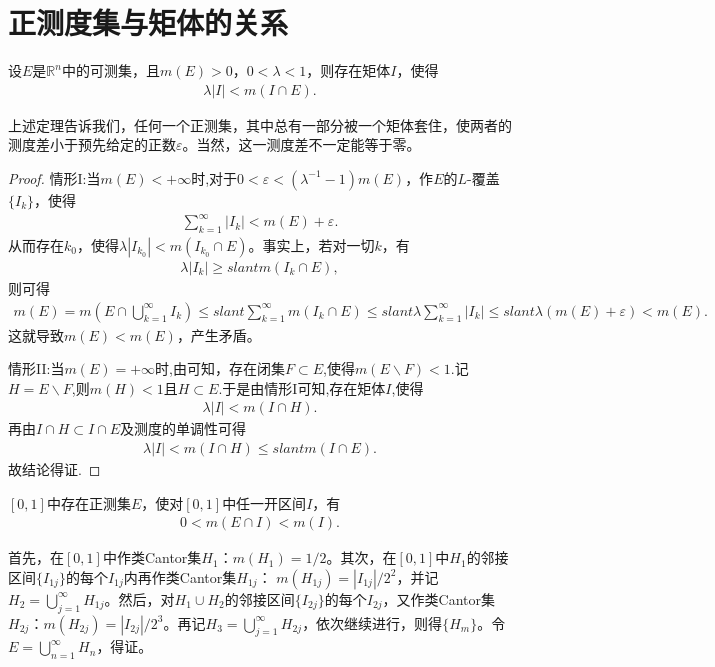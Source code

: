 \documentclass[../../main.tex]{subfiles}
\begin{document}
\section{正测度集与矩体的关系}

\begin{theorem}\label{theorem:定理2.19}
设\(E\)是\(\mathbb{R}^n\)中的可测集，且\(m(E)>0\)，\(0 < \lambda < 1\)，则存在矩体\(I\)，使得
\begin{align}
\lambda|I|<m(I\cap E).\label{eq:2.8}
\end{align}
\end{theorem}
\begin{remark}
上述定理告诉我们，任何一个正测集，其中总有一部分被一个矩体套住，使两者的测度差小于预先给定的正数\(\varepsilon\)。当然，这一测度差不一定能等于零。 
\end{remark}
\begin{proof}
{\heiti 情形I:}当\(m(E)<+\infty\)时,对于\(0 < \varepsilon < (\lambda^{-1}-1)m(E)\)，作\(E\)的\(L\)-覆盖\(\{I_k\}\)，使得
\begin{align*}
\sum_{k = 1}^{\infty}|I_k|<m(E)+\varepsilon.
\end{align*}
从而存在\(k_0\)，使得\(\lambda|I_{k_0}|<m(I_{k_0}\cap E)\)。事实上，若对一切\(k\)，有
\begin{align*}
\lambda|I_k|\geqslant slant m(I_k\cap E),
\end{align*}
则可得
\begin{align*}
m(E)=m(E\cap \bigcup_{k=1}^{\infty}I_k)\leqslant slant\sum_{k = 1}^{\infty}m(I_k\cap E)\leqslant slant\lambda\sum_{k = 1}^{\infty}|I_k|\leqslant slant\lambda(m(E)+\varepsilon)<m(E).
\end{align*}
这就导致\(m(E)<m(E)\)，产生矛盾。

{\heiti 情形II:}当$m(E)=+\infty$时,由可知，存在闭集$F\subset E$,使得$m(E\backslash F)<1$.记$H=E\backslash F$,则$m(H)<1$且$H\subset E$.于是由{\heiti 情形I}可知,存在矩体$I$,使得
\begin{align*}
\lambda |I|<m(I\cap H).
\end{align*}
再由$I\cap H\subset I\cap E$及测度的单调性可得
\begin{align*}
\lambda |I|<m(I\cap H)\leqslant slant m(I\cap E).
\end{align*}
故结论得证.
\end{proof}

\begin{example}
\([0,1]\)中存在正测集\(E\)，使对\([0,1]\)中任一开区间\(I\)，有
\begin{align*}
0 < m(E\cap I) < m(I).
\end{align*}
\end{example}
\begin{solution}
首先，在\([0,1]\)中作类Cantor集\(H_1\)：\(m(H_1)=1/2\)。其次，在\([0,1]\)中\(H_1\)的邻接区间\(\{I_{1j}\}\)的每个\(I_{1j}\)内再作类Cantor集\(H_{1j}\)：
\(m(H_{1j}) = |I_{1j}|/2^2\)，并记\(H_2 = \bigcup_{j = 1}^{\infty}H_{1j}\)。然后，对\(H_1\cup H_2\)的邻接区间\(\{I_{2j}\}\)的每个\(I_{2j}\)，又作类Cantor集\(H_{2j}\)：\(m(H_{2j}) = |I_{2j}|/2^3\)。再记\(H_3 = \bigcup_{j = 1}^{\infty}H_{2j}\)，依次继续进行，则得\(\{H_m\}\)。令\(E = \bigcup_{n = 1}^{\infty}H_n\)，得证。 
\end{solution}
\end{document}
